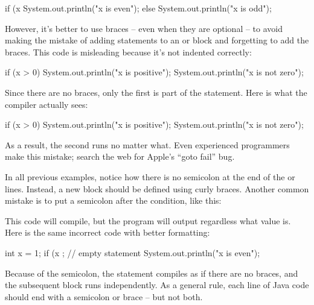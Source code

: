 \begin{code}
if (x %
    System.out.println("x is even");
else
    System.out.println("x is odd");
\end{code}

However, it's better to use braces -- even when they are optional -- to avoid making the mistake of adding statements to an  or  block and forgetting to add the braces.
This code is misleading because it's not indented correctly:

\begin{code}
if (x > 0)
    System.out.println("x is positive");
    System.out.println("x is not zero");
\end{code}

Since there are no braces, only the first  is part of the  statement.
Here is what the compiler actually sees:

\begin{code}
if (x > 0) {
    System.out.println("x is positive");
}
    System.out.println("x is not zero");
\end{code}

As a result, the second  runs no matter what.
Even experienced programmers make this mistake; search the web for Apple's ``goto fail'' bug.

In all previous examples, notice how there is no semicolon at the end of the  or  lines.
Instead, a new block should be defined using curly braces.
Another common mistake is to put a semicolon after the condition, like this:


This code will compile, but the program will output  regardless what value  is.
Here is the same incorrect code with better formatting:

\begin{code}
int x = 1;
if (x %
    ;  // empty statement
{
    System.out.println("x is even");
}
\end{code}

Because of the semicolon, the  statement compiles as if there are no braces, and the subsequent block runs independently.
As a general rule, each line of Java code should end with a semicolon or brace -- but not both.

